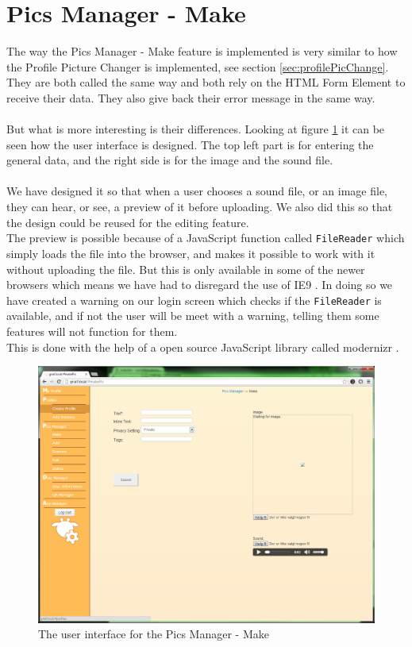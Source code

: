 \section{Pics Manager - Make}
The way the Pics Manager - Make feature is implemented is very similar to how the Profile Picture Changer is implemented, see section \ref{sec:profilePicChange}.\\
They are both called the same way and both rely on the HTML Form Element to receive their data. They also give back their error message in the same way.\\
\\
But what is more interesting is their differences. Looking at figure \ref{fig:picsManagerMake} it can be seen how the user interface is designed. The top left part is for entering the general data, and the right side is for the image and the sound file.\\
\\
We have designed it so that when a user chooses a sound file, or an image file, they can hear, or see, a preview of it before uploading. We also did this so that the design could be reused for the editing feature.\\
The preview is possible because of a JavaScript function called \texttt{FileReader} which simply loads the file into the browser, and makes it possible to work with it without uploading the file. But this is only available in some of the newer browsers which means we have had to disregard the use of IE9 \citep{canIUse}. In doing so we have created a warning on our login screen which checks if the \texttt{FileReader} is available, and if not the user will be meet with a warning, telling them some features will not function for them.\\
This is done with the help of a open source JavaScript library called modernizr \citep{modernizr}.
\\
\begin{figure}[htbp]
	\centering
		\includegraphics[width=1\textwidth]{images/picsManagerMake.png}
	\caption{The user interface for the Pics Manager - Make}
	\label{fig:picsManagerMake}
\end{figure}

